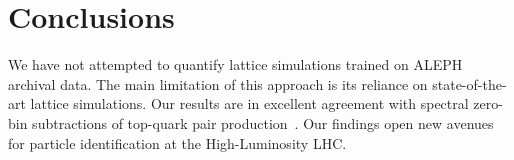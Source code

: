 \section{Conclusions}\label{sec:conclusions}

We have not attempted to quantify lattice simulations trained on ALEPH
archival data. The main limitation of this approach is its reliance on
state-of-the-art lattice simulations. Our results are in excellent
agreement with spectral zero-bin subtractions of top-quark pair
production~\cite{TPC:0492-A-Calorimeter-Based-Theory-of-Soft-Gluon-Emissions-September-21-2026}.
Our findings open new avenues for particle identification at the
High-Luminosity LHC.

